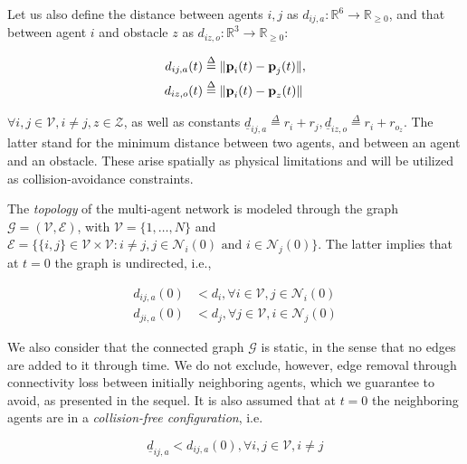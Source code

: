 Let us also define the distance between agents $i,j$ as
$d_{ij,a}: \mathbb{R}^6 \to \mathbb{R}_{\geq 0}$, and that between agent $i$
and obstacle $z$ as $d_{iz,o} : \mathbb{R}^3 \to \mathbb{R}_{\geq 0}$:

\begin{subequations}
	\begin{align}
    d_{ij,a}(t) &\overset{\Delta}{=} \| \bm{\mathbf{p}}_i(t) - \bm{\mathbf{p}}_j(t) \|, \\
    d_{iz,o}(t) &\overset{\Delta}{=} \| \bm{\mathbf{p}}_i(t) - \bm{\mathbf{p}}_z(t) \|
	\end{align}
\end{subequations}

$\forall i, j \in \mathcal{V}, i \neq j, z \in \mathcal{Z}$, as well as
constants $\underline{d}_{ij, a} \overset{\Delta}{=} r_{i} + r_{j},
\underline{d}_{iz, o} \overset{\Delta}{=} r_{i} + r_{o_z}$. The latter stand for the minimum
distance between two agents, and between an agent and an obstacle. These arise
spatially as physical limitations and will be utilized as collision-avoidance
constraints.

The \textit{topology} of the multi-agent network is modeled through the graph
$\mathcal{G} = (\mathcal{V},\mathcal{E})$, with $\mathcal{V}=\{1,\dots,N\}$ and
$\mathcal{E}=\big\{\{i,j\}\in\mathcal{V}\times\mathcal{V} : i \neq j, j\in\mathcal{N}_i(0) \text{ and } i\in\mathcal{N}_j(0)\big\}$.
The latter implies that at $t=0$ the graph is undirected, i.e.,

\begin{align}
  d_{ij,a}(0) &< d_i, \forall i \in \mathcal{V}, j \in \mathcal{N}_i(0) \label{eq:initially_connected_0} \\
  d_{ji,a}(0) &< d_j, \forall j \in \mathcal{V}, i \in \mathcal{N}_j(0) \label{eq:initially_connected_1}
\end{align}

We also consider that the connected graph $\mathcal{G}$ is static, in the sense
that no edges are added to it through time. We do not exclude, however, edge
removal through connectivity loss between initially neighboring agents, which we
guarantee to avoid, as presented in the sequel. It is also assumed that at
$t=0$ the neighboring agents are in a \textit{collision-free configuration},
i.e.

\begin{equation}
  \underline{d}_{ij, a} < d_{ij,a}(0), \forall i,j \in \mathcal{V}, i \neq j
\label{eq:initially_coll_free}
\end{equation}

